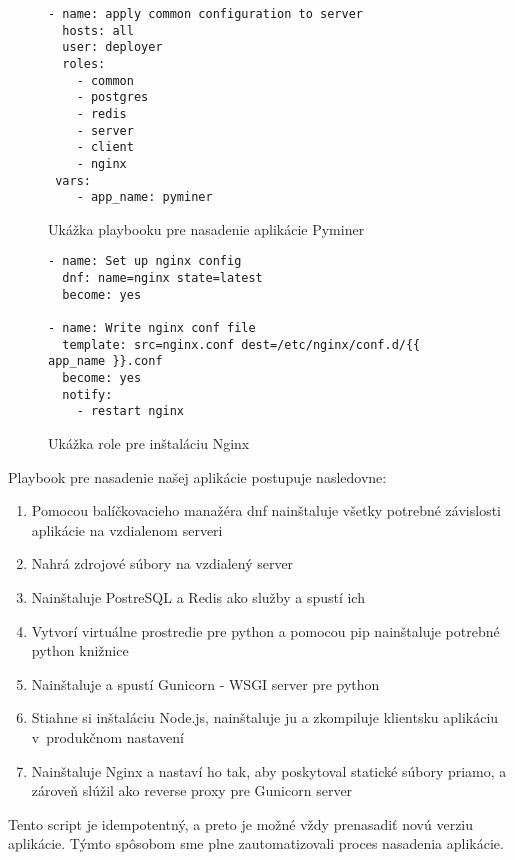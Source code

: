 \begin{figure}[htbp]
\centering
\begin{minipage}{0.9\textwidth}
\lstset{columns=flexible,breaklines=true,breakatwhitespace=true, showstringspaces=false}
\begin{lstlisting}
- name: apply common configuration to server
  hosts: all
  user: deployer
  roles:
    - common
    - postgres
    - redis
    - server
    - client
    - nginx
 vars:
  	- app_name: pyminer
\end{lstlisting} 		
\end{minipage} 
\caption{Ukážka playbooku pre nasadenie aplikácie Pyminer}
\label{fig:playbook}
\end{figure}

\begin{figure}[htbp]
\centering
\begin{minipage}{0.9\textwidth}
\lstset{columns=flexible,breaklines=true,breakatwhitespace=true, showstringspaces=false}
\begin{lstlisting}
- name: Set up nginx config
  dnf: name=nginx state=latest
  become: yes

- name: Write nginx conf file
  template: src=nginx.conf dest=/etc/nginx/conf.d/{{ app_name }}.conf
  become: yes
  notify:
    - restart nginx
\end{lstlisting} 		
\end{minipage} 
\caption{Ukážka role pre inštaláciu Nginx}
\label{fig:role}
\end{figure}
 
Playbook pre nasadenie našej aplikácie postupuje nasledovne:

\begin{enumerate}
  \item Pomocou balíčkovacieho manažéra dnf nainštaluje všetky potrebné závislosti aplikácie na vzdialenom serveri
  \item Nahrá zdrojové súbory na vzdialený server
  \item Nainštaluje PostreSQL a Redis ako služby a spustí ich
  \item Vytvorí virtuálne prostredie pre python a pomocou pip nainštaluje potrebné python knižnice
  \item Nainštaluje a spustí Gunicorn - WSGI server pre python
  \item Stiahne si inštaláciu Node.js, nainštaluje ju a zkompiluje klientsku aplikáciu v~produkčnom nastavení
  \item Nainštaluje Nginx a nastaví ho tak, aby poskytoval statické súbory priamo, a zároveň slúžil ako reverse proxy pre Gunicorn server
\end{enumerate}


Tento script je idempotentný, a preto je možné vždy prenasadiť novú verziu aplikácie.
Týmto spôsobom sme plne zautomatizovali proces nasadenia aplikácie. 



